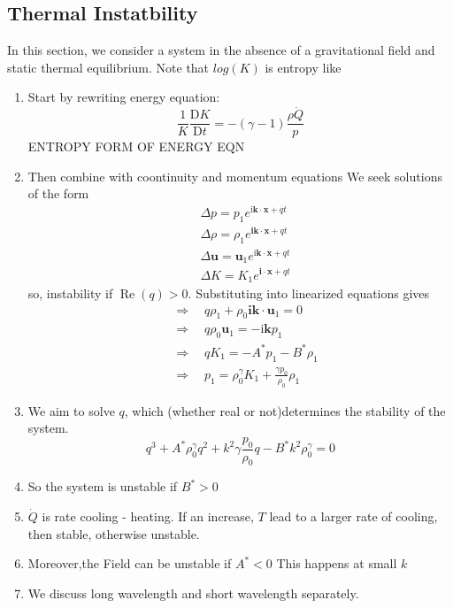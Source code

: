 \documentclass[12pt,a4paper]{article}
\begin{document}
\subsection{Thermal Instatbility}
In this section, we consider a system in the absence of a gravitational field and static thermal equilibrium.
Note that $log(K)$ is entropy like 
\begin{enumerate}
    \item Start by rewriting energy equation:
    $$
        \frac{1}{K} \frac{\mathrm{D} K}{\mathrm{D} t}=-(\gamma-1) \frac{\rho \dot{Q}}{p}
    $$
    ENTROPY FORM OF ENERGY EQN
    \item Then combine with coontinuity and momentum equations
    We seek solutions of the form
    $$
    \begin{aligned}
    & \Delta p=p_1 e^{\mathrm{i} \mathbf{k} \cdot \mathbf{x}+q t} \\
    & \Delta \rho=\rho_1 e^{\mathbf{i} \mathbf{k} \cdot \mathbf{x}+q t} \\
    & \Delta \mathbf{u}=\mathbf{u}_1 e^{\mathrm{i} \mathbf{k} \cdot \mathbf{x}+q t} \\
    & \Delta K=K_1 e^{\mathbf{i} \cdot \mathbf{x}+q t}
    \end{aligned}
    $$
    so, instability if $\operatorname{Re}(q)>0$. Substituting into linearized equations gives
    $$
    \begin{aligned}
        &\Rightarrow \quad q \rho_1+\rho_0 \mathbf{i} \mathbf{k} \cdot \mathbf{u}_1=0\\
        &\Rightarrow \quad q \rho_0 \mathbf{u}_1=-\mathrm{i} \mathbf{k} p_1\\
        &\Rightarrow \quad q K_1=-A^* p_1-B^* \rho_1\\
        &\Rightarrow \quad p_1=\rho_0^\gamma K_1+\frac{\gamma p_0}{\rho_0} \rho_1
    \end{aligned}
    $$
    \item We aim to solve $q$, which (whether real or not)determines the stability of the system.
    $$
    q^3+A^* \rho_0^\gamma q^2+k^2 \gamma \frac{p_0}{\rho_0} q-B^* k^2 \rho_0^\gamma=0
    $$
    \item So the system is unstable if $B^*>0$
    \item $\dot{Q}$ is rate cooling - heating. If an increase, $T$ lead to a larger rate of cooling, then stable, otherwise unstable.
    \item Moreover,the Field can be unstable if $A^*<0$ This happens at small $k$
    \item We discuss long wavelength and short wavelength separately.
\end{enumerate} 
\end{document}
